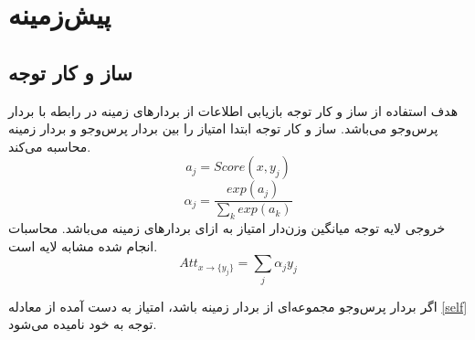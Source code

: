 
\chapter{پیش‌زمینه}
\thispagestyle{empty}

\section{ساز و کار توجه
}\label{attention}
هدف استفاده از ساز و کار توجه
بازیابی اطلاعات از بردارهای زمینه
در رابطه با بردار پرس‌وجو
می‌باشد. ساز و کار توجه ابتدا امتیاز 
را بین بردار پرس‌وجو 
و بردار زمینه
محاسبه می‌کند.
\begin{equation}
	a_j = Score(x, y_j)
\end{equation}
\begin{equation}
	\alpha_j = \frac{exp(a_j)}{\sum_{k} exp(a_k)}
\end{equation}
خروجی لایه توجه میانگین وزن‌دار امتیاز 
به ازای بردار‌های زمینه می‌باشد. محاسبات انجام شده مشابه لایه 
است.
\begin{equation}\label{self}
	Att_{x \to \{y_j\}} = \sum_{j} \alpha_jy_j
\end{equation}


اگر بردار پرس‌وجو
مجموعه‌ای از بردار زمینه
باشد، امتیاز به دست آمده از معادله
\ref{self}
 توجه به خود
  نامیده می‌شود.



